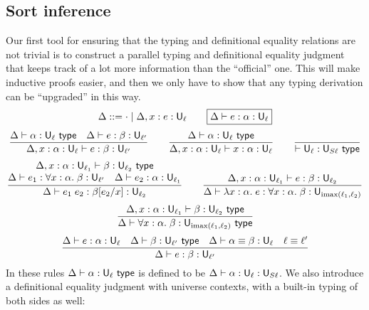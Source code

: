 \subsection{Sort inference}
Our first tool for ensuring that the typing and definitional equality relations are not trivial is to construct a parallel typing and definitional equality judgment that keeps track of a lot more information than the ``official'' one. This will make inductive proofs easier, and then we only have to show that any typing derivation can be ``upgraded'' in this way.
$$\Delta::=\cdot\mid\Delta,x:e:\U_\ell\qquad
\boxed{\Delta\vdash e:\alpha:\U_\ell}$$
$$\frac{\Delta\vdash\alpha:\U_\ell\type\quad\Delta\vdash e:\beta:\U_{\ell'}}{\Delta,x:\alpha:\U_\ell\vdash e:\beta:\U_{\ell'}}\qquad
\frac{\Delta\vdash\alpha:\U_\ell\type}{\Delta,x:\alpha:\U_\ell\vdash x:\alpha:\U_\ell}\qquad
\frac{}{\vdash\U_\ell:\U_{S\ell}\type}$$
$$\frac{\begin{matrix}
\Delta,x:\alpha:\U_{\ell_1}\vdash\beta:\U_{\ell_2}\type\\
\Delta\vdash e_1:\forall x:\alpha.\;\beta:\U_{\ell'}\quad\Delta\vdash e_2:\alpha:\U_{\ell_1}
\end{matrix}}{\Delta\vdash e_1\;e_2:\beta[e_2/x]:\U_{\ell_2}}\qquad
\frac{\Delta,x:\alpha:\U_{\ell_1}\vdash e:\beta:\U_{\ell_2}}{\Delta\vdash\lambda x:\alpha.\;e:\forall x:\alpha.\;\beta:\U_{\imax(\ell_1,\ell_2)}}$$
$$\frac{\Delta,x:\alpha:\U_{\ell_1}\vdash \beta:\U_{\ell_2}\type}{\Delta\vdash\forall x:\alpha.\;\beta:\U_{\imax(\ell_1,\ell_2)}\type}$$
$$\frac{\Delta\vdash e:\alpha:\U_\ell\quad \Delta\vdash \beta:\U_{\ell'}\type\quad \Delta\vdash\alpha\equiv\beta:\U_\ell\quad\ell\equiv\ell'}{\Delta\vdash e:\beta:\U_{\ell'}}$$
In these rules $\Delta\vdash \alpha:\U_\ell\type$ is defined to be $\Delta\vdash \alpha:\U_\ell:\U_{S\ell}$. We also introduce a definitional equality judgment with universe contexts, with a built-in typing of both sides as well:

